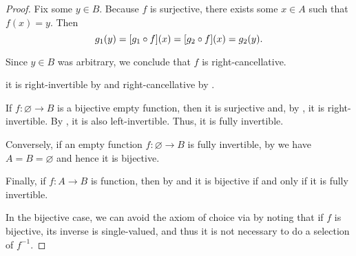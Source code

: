 \begin{proof}
  Fix some \( y \in B \). Because \( f \) is surjective, there exists some \( x \in A \) such that \( f(x) = y \). Then
  \begin{equation*}
    g_1(y) = [g_1 \bincirc f](x) = [g_2 \bincirc f](x) = g_2(y).
  \end{equation*}

  Since \( y \in B \) was arbitrary, we conclude that \( f \) is right-cancellative.

  it is right-invertible by  and right-cancellative by .

   If \( f: \varnothing \to B \) is a bijective empty function, then it is surjective and, by , it is right-invertible. By , it is also left-invertible. Thus, it is fully invertible.

  Conversely, if an empty function \( f: \varnothing \to B \) is fully invertible, by  we have \( A = B = \varnothing \) and hence it is bijective.

  Finally, if \( f: A \to B \) is  function, then by  and  it is bijective if and only if it is fully invertible.

  In the bijective case, we can avoid the axiom of choice via  by noting that if \( f \) is bijective, its inverse is single-valued, and thus it is not necessary to do a selection of \( f^{-1} \).
\end{proof}

